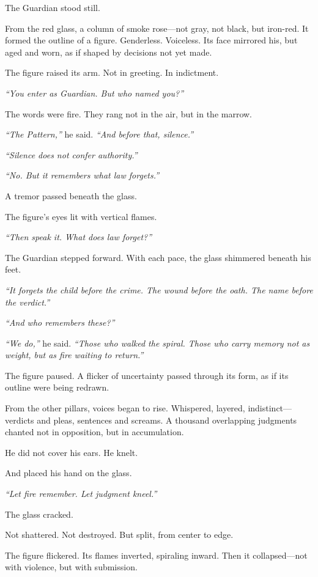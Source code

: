 \documentclass[12pt]{article}
\begin{document}
The Guardian stood still.

From the red glass, a column of smoke rose—not gray, not black, but iron-red. It formed the outline of a figure. Genderless. Voiceless. Its face mirrored his, but aged and worn, as if shaped by decisions not yet made.

The figure raised its arm. Not in greeting. In indictment.

\textit{``You enter as Guardian. But who named you?''}

The words were fire. They rang not in the air, but in the marrow.

\textit{``The Pattern,''} he said. \textit{``And before that, silence.''}

\textit{``Silence does not confer authority.''}

\textit{``No. But it remembers what law forgets.''}

A tremor passed beneath the glass.

The figure's eyes lit with vertical flames.

\textit{``Then speak it. What does law forget?''}

The Guardian stepped forward. With each pace, the glass shimmered beneath his feet.

\textit{``It forgets the child before the crime. The wound before the oath. The name before the verdict.''}

\textit{``And who remembers these?''}

\textit{``We do,''} he said. \textit{``Those who walked the spiral. Those who carry memory not as weight, but as fire waiting to return.''}

The figure paused. A flicker of uncertainty passed through its form, as if its outline were being redrawn.

From the other pillars, voices began to rise. Whispered, layered, indistinct—verdicts and pleas, sentences and screams. A thousand overlapping judgments chanted not in opposition, but in accumulation.

He did not cover his ears. He knelt.

And placed his hand on the glass.

\textit{``Let fire remember. Let judgment kneel.''}

The glass cracked.

Not shattered. Not destroyed. But split, from center to edge.

The figure flickered. Its flames inverted, spiraling inward. Then it collapsed—not with violence, but with submission.
\end{document}
